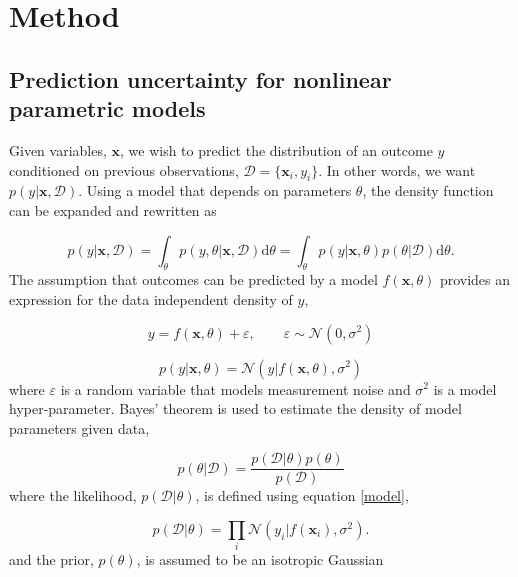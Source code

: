 \documentclass[11pt]{article} %
\begin{document}
\clearpage
\section*{Method}

\subsection*{Prediction uncertainty for nonlinear parametric models}

Given variables, $\mathbf{x}$, we wish to predict the distribution of an outcome $y$ conditioned on previous observations, $\mathcal{D} = \{\mathbf{x}_i, y_i\}$. In other words, we want $p(y | \mathbf{x}, \mathcal{D})$. Using a model that depends on parameters $\theta$, the density function can be expanded and rewritten as 

\begin{equation}
p(y | \mathbf{x}, \mathcal{D}) 
= \int_{\theta} p(y, \theta | \mathbf{x}, \mathcal{D}) \mathrm{d} \theta 
= \int_{\theta} p(y | \mathbf{x}, \theta) p(\theta | \mathcal{D}) \mathrm{d} \theta.
\label{posterior predictive 1}
\end{equation}
The assumption that outcomes can be predicted by a model $f(\mathbf{x}, \theta)$ provides an expression for the data independent density of $y$, 

\begin{equation}
y = f(\mathbf{x}, \theta) + \varepsilon, \qquad \varepsilon \sim \mathcal{N}(0, \sigma^2)
\end{equation}

\begin{equation}
p(y | \mathbf{x}, \theta) = \mathcal{N} (y | f(\mathbf{x}, \theta), \sigma^2)
\label{model}
\end{equation}
where $\varepsilon$ is a random variable that models measurement noise and $\sigma^2$ is a model hyper-parameter. Bayes' theorem is used to estimate the density of model parameters given data, 

\begin{equation}
p(\theta | \mathcal{D}) = \frac{p(\mathcal{D} | \theta) p(\theta)}{p(\mathcal{D})}
\end{equation}
where the likelihood, $p(\mathcal{D} | \theta)$, is defined using equation \ref{model},

\begin{equation}
p(\mathcal{D} | \theta) = \prod_i \mathcal{N}(y_i | f(\mathbf{x}_i), \sigma^2).
\end{equation}
and the prior, $p(\theta)$, is assumed to be an isotropic Gaussian
\end{document}
